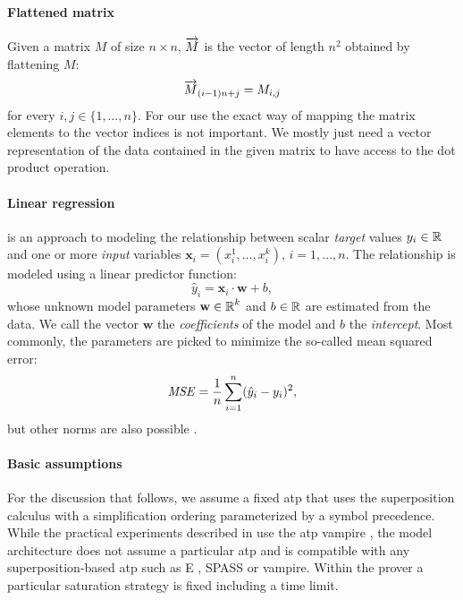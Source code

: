 \documentclass{ceurart}
\begin{document}
\paragraph{Flattened matrix}
Given a matrix \(M\) of size \(n \times n\),
\(\overrightarrow{M}\) is the vector of length \(n^2\) obtained by flattening \(M\):
\begin{align*}
\overrightarrow{M}_{(i - 1) n + j} = M_{i, j}
\end{align*}
for every \(i,j\in\{1,\ldots,n\}\). For our use the exact way of mapping the 
matrix elements to the vector indices is not important. We mostly just need a vector representation
of the data contained in the given matrix to have access to the dot product operation. %

\paragraph{Linear regression}
is an approach to modeling the relationship between scalar \emph{target} values $y_i \in \operatorname{\mathbb{R}}$
and one or more \emph{input} variables $\mathbf{x}_i = (x^1_i,\ldots,x^k_i)$, $i = 1,\ldots,n$.
The relationship is modeled using a linear predictor function:
\[\hat{y}_i =  \mathbf{x}_i \cdot \mathbf{w} + b, \]
whose unknown model parameters $\mathbf{w}\in \operatorname{\mathbb{R}}^k$ and $b \in \operatorname{\mathbb{R}}$ are estimated from the data.
We call the vector $\mathbf{w}$ the \emph{coefficients} of the model and $b$ the \emph{intercept}.
Most commonly, the parameters are picked to minimize the so-called mean squared error:
\[\mathit{MSE} = \frac{1}{n} \sum\limits_{i=1}^n (\hat{y}_i - y_i)^2, \]
but other norms are also possible \cite{hastie01statisticallearning}.


\paragraph{Basic assumptions}

For the discussion that follows,
we assume a fixed %
\gls*{atp} that uses the superposition calculus with a simplification ordering parameterized by a symbol precedence.
While the practical experiments described in  use the \gls*{atp} \gls*{vampire} \cite{Kovacs2013},
the model architecture does not assume a particular \gls*{atp}
and is compatible with any superposition-based \gls*{atp} such as E \cite{SCV:CADE-2019}, SPASS \cite{DBLP:conf/cade/WeidenbachDFKSW09} or  \gls*{vampire}.
Within the prover a particular saturation strategy is fixed including a time limit.
\end{document}
